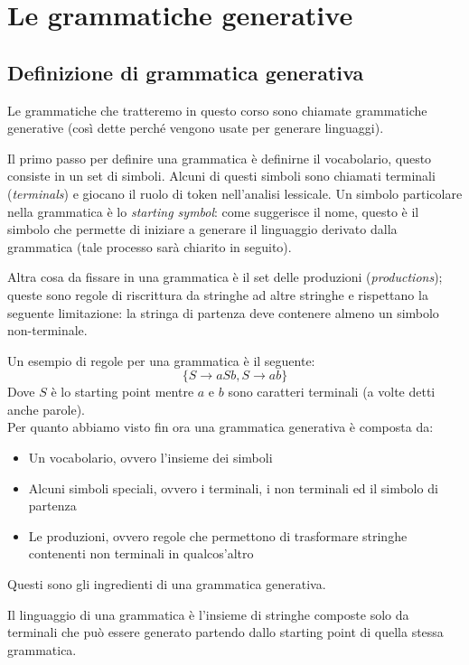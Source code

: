 \documentclass[class=book, crop=false, oneside]{standalone}
\begin{document}
\chapter{Le grammatiche generative}

\section{Definizione di grammatica generativa}
Le grammatiche che tratteremo in questo corso sono chiamate grammatiche generative (così dette perché vengono usate per generare linguaggi).

Il primo passo per definire una grammatica è definirne il vocabolario, questo consiste in un set di simboli.
Alcuni di questi simboli sono chiamati terminali (\emph{terminals}) e giocano il ruolo di token nell’analisi lessicale.
Un simbolo particolare nella grammatica è lo \emph{starting symbol}: come suggerisce il nome, questo è il simbolo che permette di iniziare a generare il linguaggio derivato dalla grammatica (tale processo sarà chiarito in seguito).

Altra cosa da fissare in una grammatica è il set delle produzioni (\emph{productions}); queste sono regole di riscrittura da stringhe ad altre stringhe e rispettano la seguente limitazione: la stringa di partenza deve contenere almeno un simbolo non-terminale.

Un esempio di regole per una grammatica è il seguente:
\begin{equation}
    \{S \to aSb, S \to ab\}
    \label{produzioni_esempio_0}
\end{equation}
Dove $S$ è lo starting point mentre $a$ e $b$ sono caratteri terminali (a volte detti anche parole).\\
Per quanto abbiamo visto fin ora una grammatica generativa è composta da:
	\begin{itemize}
        \item Un vocabolario, ovvero l'insieme dei simboli
        \item Alcuni simboli speciali, ovvero i terminali, i non terminali ed il simbolo di partenza
        \item Le produzioni, ovvero regole che permettono di trasformare stringhe contenenti non terminali in qualcos’altro
    \end{itemize}
Questi sono gli ingredienti di una grammatica generativa.

Il linguaggio di una grammatica è l’insieme di stringhe composte solo da terminali che può essere generato partendo dallo starting point di quella stessa grammatica.
\end{document}

